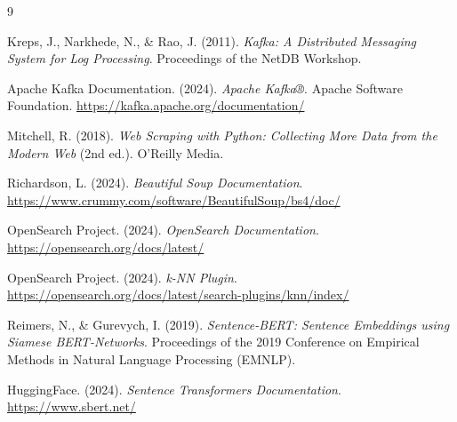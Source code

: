 \documentclass[12pt, a4paper]{article}
\begin{document}
\newpage
\begin{thebibliography}{9}

Kreps, J., Narkhede, N., \& Rao, J. (2011). 
\textit{Kafka: A Distributed Messaging System for Log Processing}. 
Proceedings of the NetDB Workshop.

Apache Kafka Documentation. (2024). 
\textit{Apache Kafka®}. Apache Software Foundation. 
\url{https://kafka.apache.org/documentation/}

Mitchell, R. (2018). 
\textit{Web Scraping with Python: Collecting More Data from the Modern Web} (2nd ed.). 
O'Reilly Media.

Richardson, L. (2024). 
\textit{Beautiful Soup Documentation}. 
\url{https://www.crummy.com/software/BeautifulSoup/bs4/doc/}

OpenSearch Project. (2024). 
\textit{OpenSearch Documentation}. 
\url{https://opensearch.org/docs/latest/}

OpenSearch Project. (2024). 
\textit{k-NN Plugin}. 
\url{https://opensearch.org/docs/latest/search-plugins/knn/index/}

Reimers, N., \& Gurevych, I. (2019). 
\textit{Sentence-BERT: Sentence Embeddings using Siamese BERT-Networks}. 
Proceedings of the 2019 Conference on Empirical Methods in Natural Language Processing (EMNLP).

HuggingFace. (2024). 
\textit{Sentence Transformers Documentation}. 
\url{https://www.sbert.net/}

\end{thebibliography}
\end{document}
